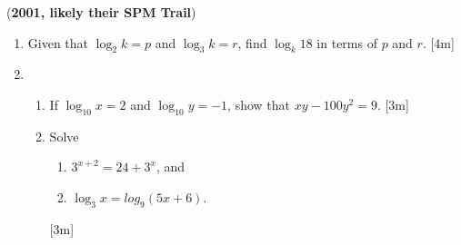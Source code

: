 \documentclass[notoc,notitlepage]{tufte-book}
\begin{document}
(\textbf{2001, likely their SPM Trail})
\begin{enumerate}
  \item Given that $\log_2 k = p$ and $\log_3 k =  r$, find $\log_k 18$ in terms
    of $p$ and $r$. [4m]

  \item 
    \begin{enumerate}
      \item If $\log_{10} x = 2$ and $\log_{10} y = -1$, show that $xy - 100y^2
        = 9$. [3m]
      \item Solve
        \begin{enumerate}
          \item $3^{x + 2} = 24 + 3^x$, and
          \item $\log_3 x = log_9 (5x + 6)$.
        \end{enumerate}
        [3m]
    \end{enumerate}
\end{enumerate}
\end{document}
